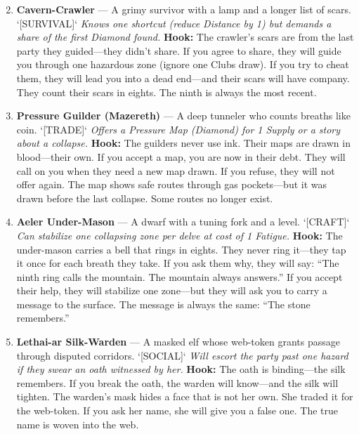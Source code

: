 \begin{enumerate}
\setcounter{enumi}{1}
\item \textbf{Cavern-Crawler} --- A grimy survivor with a lamp and a longer list of scars. `[SURVIVAL]`
  \hfill \textit{Knows one shortcut (reduce Distance by 1) but demands a share of the first Diamond found.}
  \textbf{Hook:} The crawler's scars are from the last party they guided---they didn't share. If you agree to share, they will guide you through one hazardous zone (ignore one Clubs draw). If you try to cheat them, they will lead you into a dead end---and their scars will have company. They count their scars in eights. The ninth is always the most recent.

\item \textbf{Pressure Guilder (Mazereth)} --- A deep tunneler who counts breaths like coin. `[TRADE]`
  \hfill \textit{Offers a Pressure Map (Diamond) for 1 Supply or a story about a collapse.}
  \textbf{Hook:} The guilders never use ink. Their maps are drawn in blood---their own. If you accept a map, you are now in their debt. They will call on you when they need a new map drawn. If you refuse, they will not offer again. The map shows safe routes through gas pockets---but it was drawn before the last collapse. Some routes no longer exist.

\item \textbf{Aeler Under-Mason} --- A dwarf with a tuning fork and a level. `[CRAFT]`
  \hfill \textit{Can stabilize one collapsing zone per delve at cost of 1 Fatigue.}
  \textbf{Hook:} The under-mason carries a bell that rings in eights. They never ring it---they tap it once for each breath they take. If you ask them why, they will say: ``The ninth ring calls the mountain. The mountain always answers.'' If you accept their help, they will stabilize one zone---but they will ask you to carry a message to the surface. The message is always the same: ``The stone remembers.''

\item \textbf{Lethai-ar Silk-Warden} --- A masked elf whose web-token grants passage through disputed corridors. `[SOCIAL]`
  \hfill \textit{Will escort the party past one hazard if they swear an oath witnessed by her.}
  \textbf{Hook:} The oath is binding---the silk remembers. If you break the oath, the warden will know---and the silk will tighten. The warden's mask hides a face that is not her own. She traded it for the web-token. If you ask her name, she will give you a false one. The true name is woven into the web.


\end{enumerate}
